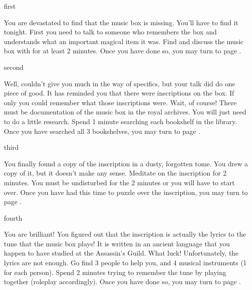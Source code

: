 \documentclass[greennotebook]{NeptuneBall}
\begin{document}

\startnotebook{\nMusicBox{}}

\begin{page}{first}

You are devastated to find that the music box is missing. You'll have to find it tonight. First you need to talk to someone who remembers the box and understands what an important magical item it was. Find \cManta{} and discuss the music box with \cManta{\them} for at least 2 minutes. Once you have done so, you may turn to page .

\end{page}

\begin{page}{second}

Well, \cManta{} couldn't give you much in the way of specifics, but your talk did do one piece of good. It has reminded you that there were inscriptions on the box. If only you could remember what those inscriptions were. Wait, of course! There must be documentation of the music box in the royal archives. You will just need to do a little research. Spend 1 minute searching each bookshelf in the library. Once you have searched all 3 bookshelves, you may turn to page .

\end{page}

\begin{page}{third}

You finally found a copy of the inscription in a dusty, forgotten tome. You drew a copy of it, but it doesn't make any sense. Meditate on the inscription for 2 minutes. You must be undisturbed for the 2 minutes or you will have to start over. Once you have had this time to puzzle over the inscription, you may turn to page .

\end{page}

\begin{page}{fourth}

You are brilliant! You figured out that the inscription is actually the lyrics to the tune that the music box plays! It is written in an ancient language that you happen to have studied at the Assassin's Guild. What luck! Unfortunately, the lyrics are not enough. Go find 3 people to help you, and 4 musical  instruments (1 for each person). Spend 2 minutes trying to remember the tune by playing together (roleplay accordingly). Once you have done so, you may turn to page .

\end{page}
\end{document}
